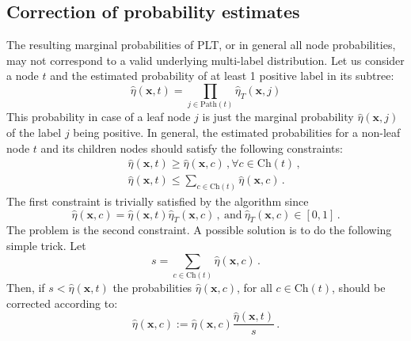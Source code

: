 \documentclass{article}
\renewcommand{\vec}[1]{\boldsymbol{#1}}
\newcommand{\bx}{\vec{x}}
\newcommand{\heta}{\hat{\eta}}
\newcommand{\pa}[1]{\mathrm{pa}(#1)}
\newcommand{\Path}[1]{\mathrm{Path}(#1)}
\newcommand{\Children}[1]{\mathrm{Ch}(#1)}
\newcommand{\sectionBefore}{-0pt}
\newcommand{\sectionAfter}{-0pt}
\begin{document}
\vspace{\sectionBefore}
\subsection{Correction of probability estimates}
\label{sec:correction}
\vspace{\sectionAfter}

The resulting marginal probabilities of PLT, or in general all node probabilities, may not correspond to a valid underlying multi-label distribution. Let us consider a node $t$ and the estimated probability of at least 1 positive label in its subtree: 
$$
\heta(\bx, t) = \prod_{j \in \Path{t}} \heta_T(\bx, j)
$$
This probability in case of a leaf node $j$ is just the marginal probability $\heta(\bx, j)$ of the label $j$ being positive.
In general, the estimated probabilities for a non-leaf node $t$ and its children nodes should satisfy the following constraints: 
\begin{eqnarray*}
&& \heta(\bx, t)  \ge \heta(\bx, c)\,, \forall c \in \Children{t}\,, \\
&& \heta(\bx, t)  \le \sum_{c \in \Children{t}}  \heta(\bx, c) \,. 
\end{eqnarray*}
The first constraint is trivially satisfied by the algorithm since 
$$
\heta(\bx, c) = \heta(\bx, t) \heta_T(\bx, c)\,,\mathrm{~and~}  \heta_T(\bx, c) \in [0,1]\,.
$$ 
The problem is the second constraint. A possible solution is to do the following simple trick. Let 
$$
s = \sum_{c \in \Children{t}} \heta(\bx, c) \,.
$$
Then, if $s < \heta(\bx, t)$ the probabilities $\heta(\bx, c)$, for all $c \in \Children{t}$, should be corrected according to:
$$
\heta(\bx, c) := \heta(\bx, c) \frac{\heta(\bx, t)}{s}\,.
$$

\end{document}
